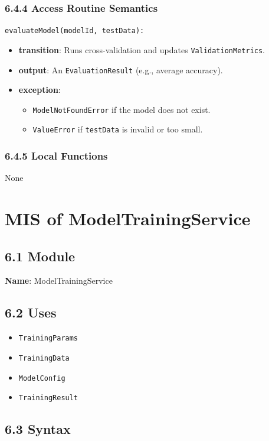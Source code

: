 \documentclass[12pt, titlepage]{article}
\begin{document}
\subsubsection{6.4.4 Access Routine Semantics}
\noindent \texttt{evaluateModel(modelId, testData):}
\begin{itemize}
    \item \textbf{transition}: Runs cross-validation and updates \texttt{ValidationMetrics}.
    \item \textbf{output}: An \texttt{EvaluationResult} (e.g., average accuracy).
    \item \textbf{exception}:
    \begin{itemize}
        \item \texttt{ModelNotFoundError} if the model does not exist.
        \item \texttt{ValueError} if \texttt{testData} is invalid or too small.
    \end{itemize}
\end{itemize}

\subsubsection{6.4.5 Local Functions}
None

\newpage


\section{MIS of ModelTrainingService}
\label{sec:ModelTrainingService}

\subsection{6.1 Module}
\textbf{Name}: ModelTrainingService

\subsection{6.2 Uses}
\begin{itemize}
    \item \texttt{TrainingParams}
    \item \texttt{TrainingData}
    \item \texttt{ModelConfig}
    \item \texttt{TrainingResult}
\end{itemize}

\subsection{6.3 Syntax}
\end{document}
